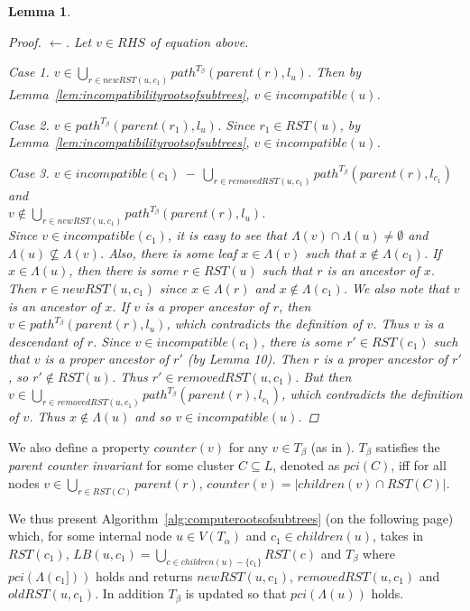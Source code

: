 \documentclass{article}
\newcommand{\leafset}{\Lambda}
\newtheorem{incompatibilityrecursive}[incompatibility]{Lemma}
\begin{document}
\begin{incompatibilityrecursive}
\begin{proof}
            $\longleftarrow$. Let $v \in RHS$ of equation above.

            \textit{Case 1.} $v \in \bigcup_{r \in newRST(u, c_1)} path^{T_\beta}(parent(r), l_u)$. Then by Lemma~\ref{lem:incompatibilityrootsofsubtrees}, $v \in incompatible(u)$.

            \textit{Case 2.} $v \in path^{T_\beta}(parent(r_1), l_u)$. Since $r_1 \in RST(u)$, by Lemma~\ref{lem:incompatibilityrootsofsubtrees}, $v \in incompatible(u)$.

            \textit{Case 3.} $v \in incompatible(c_1)\ -\ \bigcup_{r \in removedRST(u, c_1)} path^{T_\beta}(parent(r), l_{c_1})$ and\\[0.25em] %
            $v \not\in \bigcup_{r \in newRST(u, c_1)} path^{T_\beta}(parent(r), l_u)$.\\[0.25em]
            Since $v \in incompatible(c_1)$, it is easy to see that $\leafset(v) \cap \leafset(u) \neq \emptyset$ and $\leafset(u) \not\subseteq \leafset(v)$. Also, there is some leaf $x \in \leafset(v)$ such that $x \not\in \leafset(c_1)$. If $x \in \leafset(u)$, then there is some $r \in RST(u)$ such that $r$ is an ancestor of $x$. Then $r \in newRST(u, c_1)$ since $x \in \leafset(r)$ and $x \not\in \leafset(c_1)$. We also note that $v$ is an ancestor of $x$. If $v$ is a proper ancestor of $r$, then $v \in path^{T_\beta}(parent(r), l_u)$, which contradicts the definition of $v$. Thus $v$ is a descendant of $r$. Since $v \in incompatible(c_1)$, there is some $r' \in RST(c_1)$ such that $v$ is a proper ancestor of $r'$ (by Lemma 10). Then $r$ is a proper ancestor of $r'$, so $r' \not\in RST(u)$. Thus $r' \in removedRST(u, c_1)$. But then $v \in \bigcup_{r \in removedRST(u, c_1)} path^{T_\beta}(parent(r), l_{c_1})$, which contradicts the definition of $v$. Thus $x \not\in \leafset(u)$ and so $v \in incompatible(u)$.
        \end{proof}
    \end{incompatibilityrecursive}

    We also define a property $counter(v)$ for any $v \in T_\beta$ (as in \cite{jansson2018algorithms}). $T_\beta$ satisfies the \textit{parent counter invariant} for some cluster $C \subseteq L$, denoted as $pci(C)$, iff for all nodes $v \in \bigcup_{r \in RST(C)} parent(r)$, $counter(v) = |children(v) \cap RST(C)|$.

    We thus present Algorithm~\ref{alg:computerootsofsubtrees} (on the following page) which, for some internal node $u \in V(T_\alpha)$ and $c_1 \in children(u)$, takes in $RST(c_1)$, $LB(u, c_1) = \bigcup_{c \in children(u) - \{c_1\}} RST(c)$ and $T_\beta$ where $pci(\leafset(c_1]))$ holds and returns $newRST(u, c_1)$, $removedRST(u, c_1)$ and $oldRST(u, c_1)$. In addition $T_\beta$ is updated so that $pci(\leafset(u))$ holds.
\end{document}
